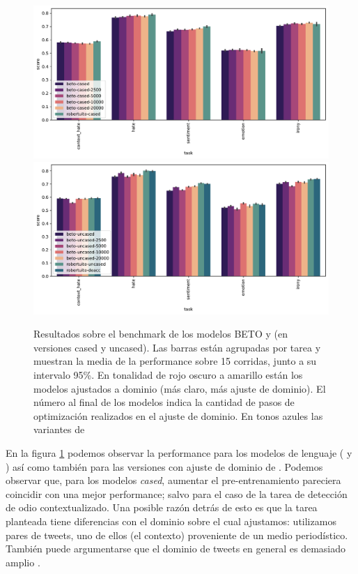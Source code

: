 \begin{figure}
    \centering
    \includegraphics[width=\textwidth]{img/robertuito/results_cased_models.pdf}
    \includegraphics[width=\textwidth]{img/robertuito/results_uncased_models.pdf}

    \caption{Resultados sobre el benchmark de los modelos BETO y \robertuito{} (en versiones cased y uncased). Las barras están agrupadas por tarea y muestran la media de la performance sobre 15 corridas, junto a su intervalo 95\%. En tonalidad de rojo oscuro a amarillo están los modelos ajustados a dominio (más claro, más ajuste de dominio). El número al final de los modelos indica la cantidad de pasos de optimización realizados en el ajuste de dominio. En tonos azules las variantes de \robertuito{}}
    \label{fig:robertuito_vs_domain_barplot_results}
\end{figure}


En la figura \ref{fig:robertuito_vs_domain_barplot_results} podemos observar la performance para los modelos de lenguaje (\beto{} y \robertuito{}) así como también para las versiones con ajuste de dominio de \beto{}. Podemos observar que, para los modelos \emph{cased}, aumentar el pre-entrenamiento pareciera coincidir con una mejor performance; salvo para el caso de la tarea de detección de odio contextualizado. Una posible razón detrás de esto es que la tarea planteada tiene diferencias con el dominio sobre el cual ajustamos: utilizamos pares de tweets, uno de ellos (el contexto) proveniente de un medio periodístico. También puede argumentarse que el dominio de tweets en general es demasiado amplio \cite{eisenstein2013bad}.

